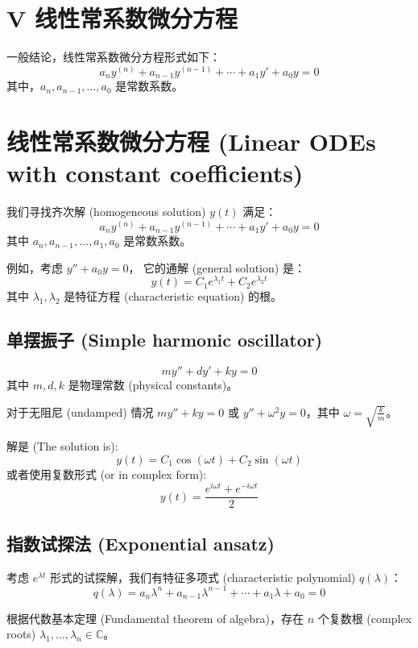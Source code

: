 \documentclass{ctexart}
\begin{document}
\section{V 线性常系数微分方程}
一般结论，线性常系数微分方程形式如下：
\begin{equation}
    a_n y^{(n)} + a_{n-1} y^{(n-1)} + \cdots + a_1 y' + a_0 y = 0
\end{equation}
其中，\(a_n, a_{n-1}, \ldots, a_0\) 是常数系数。



\section*{线性常系数微分方程 (Linear ODEs with constant coefficients)}

我们寻找齐次解 (homogeneous solution) \( y(t) \) 满足：
\[ a_n y^{(n)} + a_{n-1} y^{(n-1)} + \cdots + a_1 y' + a_0 y = 0 \]
其中 \( a_n, a_{n-1}, \ldots, a_1, a_0 \) 是常数系数。

例如，考虑 \( y'' + a_0 y = 0 \)，
它的通解 (general solution) 是：
\[ y(t) = C_1 e^{\lambda_1 t} + C_2 e^{\lambda_2 t} \]
其中 \( \lambda_1, \lambda_2 \) 是特征方程 (characteristic equation) 的根。

\subsection*{单摆振子 (Simple harmonic oscillator)}
\[ m y'' + d y' + k y = 0 \]
其中 \( m, d, k \) 是物理常数 (physical constants)。

对于无阻尼 (undamped) 情况 \( m y'' + k y = 0 \) 或 \( y'' + \omega^2 y = 0 \)，其中 \( \omega = \sqrt{\frac{k}{m}} \)。

解是 (The solution is):
\[ y(t) = C_1 \cos(\omega t) + C_2 \sin(\omega t) \]
或者使用复数形式 (or in complex form):
\[ y(t) = \frac{e^{i \omega t} + e^{-i \omega t}}{2} \]

\subsection*{指数试探法 (Exponential ansatz)}
考虑 \( e^{\lambda t} \) 形式的试探解，我们有特征多项式 (characteristic polynomial) \( q(\lambda) \)：
\[ q(\lambda) = a_n \lambda^n + a_{n-1} \lambda^{n-1} + \cdots + a_1 \lambda + a_0 = 0 \]

根据代数基本定理 (Fundamental theorem of algebra)，存在 \( n \) 个复数根 (complex roots) \( \lambda_1, \ldots, \lambda_n \in \mathbb{C} \)。
\end{document}
